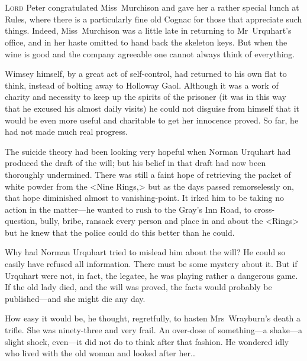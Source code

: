 \chapter[Chapter \thechapter]{}
\lettrine{L}{ord} Peter congratulated Miss~Murchison and gave her a rather special lunch at Rules, where there is a particularly fine old Cognac for those that appreciate such things. Indeed, Miss~Murchison was a little late in returning to Mr~Urquhart's office, and in her haste omitted to hand back the skeleton keys. But when the wine is good and the company agreeable one cannot always think of everything.

Wimsey himself, by a great act of self-control, had returned to his own flat to think, instead of bolting away to Holloway Gaol. Although it was a work of charity and necessity to keep up the spirits of the prisoner (it was in this way that he excused his almost daily visits) he could not disguise from himself that it would be even more useful and charitable to get her innocence proved. So far, he had not made much real progress.

The suicide theory had been looking very hopeful when Norman Urquhart had produced the draft of the will; but his belief in that draft had now been thoroughly undermined. There was still a faint hope of retrieving the packet of white powder from the <Nine Rings,> but as the days passed remorselessly on, that hope diminished almost to vanishing-point. It irked him to be taking no action in the matter—he wanted to rush to the Gray's Inn Road, to cross-question, bully, bribe, ransack every person and place in and about the <Rings> but he knew that the police could do this better than he could.

Why had Norman Urquhart tried to mislead him about the will? He could so easily have refused all information. There must be some mystery about it. But if Urquhart were not, in fact, the legatee, he was playing rather a dangerous game. If the old lady died, and the will was proved, the facts would probably be published—and she might die any day.

How easy it would be, he thought, regretfully, to hasten Mrs~Wrayburn's death a trifle. She was ninety-three and very frail. An over-dose of something—a shake—a slight shock, even—it did not do to think after that fashion. He wondered idly who lived with the old woman and looked after her\dots

